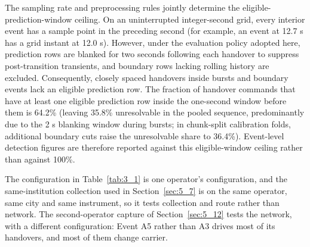 The sampling rate and preprocessing rules jointly determine the eligible-prediction-window ceiling. On an uninterrupted integer-second grid, every interior event has a sample point in the preceding second (for example, an event at 12.7 s has a grid instant at 12.0 s). However, under the evaluation policy adopted here, prediction rows are blanked for two seconds following each handover to suppress post-transition transients, and boundary rows lacking rolling history are excluded. Consequently, closely spaced handovers inside bursts and boundary events lack an eligible prediction row. The fraction of handover commands that have at least one eligible prediction row inside the one-second window before them is 64.2\% (leaving 35.8\% unresolvable in the pooled sequence, predominantly due to the 2 s blanking window during bursts; in chunk-split calibration folds, additional boundary cuts raise the unresolvable share to 36.4\%). Event-level detection figures are therefore reported against this eligible-window ceiling rather than against 100\%.

The configuration in Table~\ref{tab:3_1} is one operator's configuration, and the same-institution collection used in Section~\ref{sec:5_7} is on the same operator, same city and same instrument, so it tests collection and route rather than network. The second-operator capture of Section~\ref{sec:5_12} tests the network, with a different configuration: Event A5 rather than A3 drives most of its handovers, and most of them change carrier.

